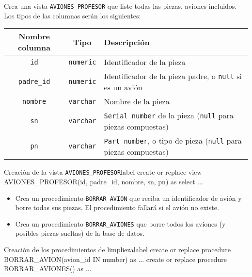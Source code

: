 \begin{homeworkProblem}

  Crea una vista \texttt{AVIONES\_PROFESOR} que liste todas las piezas, aviones incluidos. Los tipos de las columnas serán los siguientes:
  
  \begin{center}
    \begin{tabular}{|c|c|p{10cm}|}
      \hline
      \textbf{Nombre columna} & \textbf{Tipo} & \textbf{Descripción} \\ 
      \hline
      \texttt{id} & \texttt{numeric} & Identificador de la pieza \\
      \texttt{padre\_id} & \texttt{numeric} & Identificador de la pieza padre, o \texttt{null} si es un avión\\
      \texttt{nombre} & \texttt{varchar} & Nombre de la pieza \\
      \texttt{sn} & \texttt{varchar} & \texttt{Serial number} de la pieza (\texttt{null} para piezas compuestas)\\
      \texttt{pn} & \texttt{varchar} & \texttt{Part number}, o tipo de pieza (\texttt{null} para piezas compuestas)\\
      \hline
    \end{tabular}
  \end{center}

  \begin{listadosql}{Creación de la vista \texttt{AVIONES\_PROFESOR}}{label}
create or replace view AVIONES_PROFESOR(id, padre_id, nombre, sn, pn) as
select ...
\end{listadosql}

\end{homeworkProblem}

\needspace{.25\textheight}
\begin{homeworkProblem}
  \begin{itemize}
  \item Crea un procedimiento \texttt{BORRAR\_AVION} que reciba un identificador de avión y borre
    todas sus piezas. El procedimiento fallará si el avión no existe.
  \item Crea un procedimiento \texttt{BORRAR\_AVIONES} que borre todos los aviones (y posibles piezas
    sueltas) de la base de datos.
  \end{itemize}

  \begin{listadosql}{Creación de los procedimientos de limplieza}{label}
create or replace procedure BORRAR_AVION(avion_id IN number) as ... 
create or replace procedure BORRAR_AVIONES() as ...
\end{listadosql}

\end{homeworkProblem}

